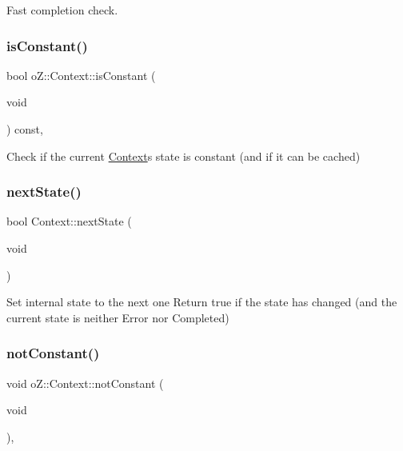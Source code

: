 Fast completion check. 

\mbox{\label{classo_z_1_1_context_a748147258019436983fdbbf6ed51c0b6}} 
\subsubsection{\texorpdfstring{isConstant()}{isConstant()}}
{\footnotesize\ttfamily bool o\+Z\+::\+Context\+::is\+Constant (\begin{DoxyParamCaption}\item[{void}]{ }\end{DoxyParamCaption}) const\hspace{0.3cm}{\ttfamily [inline]}, {\ttfamily [noexcept]}}



Check if the current \mbox{\hyperlink{classo_z_1_1_context}{Context}}\textquotesingle{}s state is constant (and if it can be cached) 

\mbox{\label{classo_z_1_1_context_aa07d51de7059b3a4fc9e3505704a33be}} 
\subsubsection{\texorpdfstring{nextState()}{nextState()}}
{\footnotesize\ttfamily bool Context\+::next\+State (\begin{DoxyParamCaption}\item[{void}]{ }\end{DoxyParamCaption})\hspace{0.3cm}{\ttfamily [noexcept]}}



Set internal state to the next one Return true if the state has changed (and the current state is neither Error nor Completed) 

\mbox{\label{classo_z_1_1_context_ada521ec57fbc2febfd61177e8bbc0128}} 
\subsubsection{\texorpdfstring{notConstant()}{notConstant()}}
{\footnotesize\ttfamily void o\+Z\+::\+Context\+::not\+Constant (\begin{DoxyParamCaption}\item[{void}]{ }\end{DoxyParamCaption})\hspace{0.3cm}{\ttfamily [inline]}, {\ttfamily [noexcept]}}



